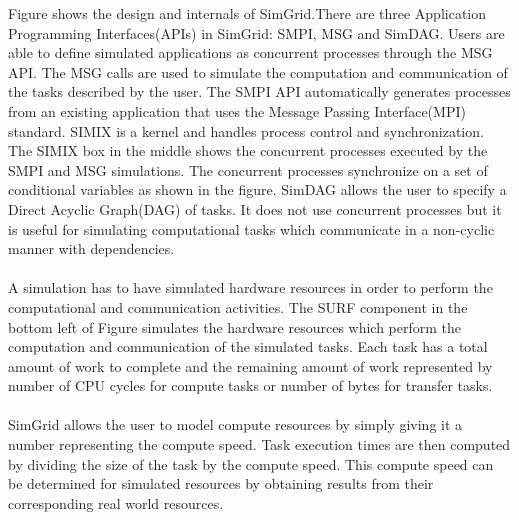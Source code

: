 \documentclass[a4paper,11pt]{article}
\begin{document}
\noindent Figure shows the design and internals of SimGrid.There are three Application Programming Interfaces(APIs) in SimGrid: SMPI, MSG and SimDAG. Users are able to define simulated applications as concurrent processes through the MSG API. The MSG calls are used to simulate the computation and communication of the tasks described by the user. The SMPI API automatically generates processes from an existing application that uses the Message Passing Interface(MPI)  standard. SIMIX is a kernel and handles process control and synchronization. The SIMIX box in the middle shows the concurrent processes executed by the SMPI and MSG simulations. The concurrent processes synchronize on a set of conditional variables as shown in the figure. SimDAG allows the user to specify a Direct Acyclic Graph(DAG) of tasks. It does not use concurrent processes but it is useful for simulating computational tasks which communicate in a non-cyclic manner with dependencies.
\\\\
A simulation has to have simulated hardware resources in order to perform the computational and communication activities. The SURF component in the bottom left of Figure simulates the hardware resources which perform the computation and communication of the simulated tasks. Each task has a total amount of work to complete and the remaining amount of work represented by number of CPU cycles for compute tasks or number of bytes for transfer tasks.
\\\\
SimGrid allows the user to model compute resources by simply giving it a number representing the compute speed. Task execution times are then computed by dividing the size of the task by the compute speed. This compute speed can be determined for simulated resources by obtaining results from their corresponding real world resources.
\\\\
\end{document}
